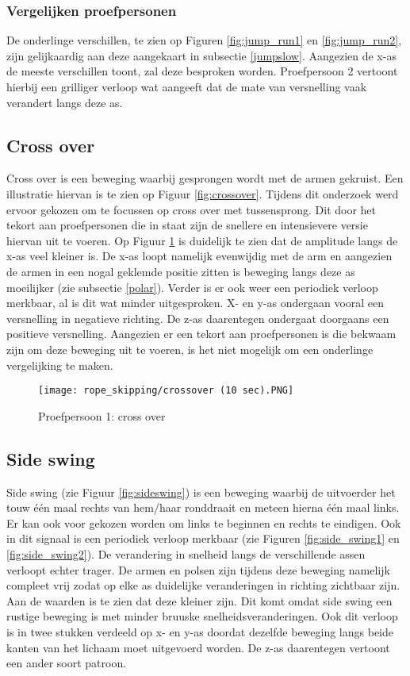\subsubsection{Vergelijken proefpersonen}
De onderlinge verschillen, te zien op Figuren \ref{fig:jump_run1} en \ref{fig:jump_run2}, zijn gelijkaardig aan deze aangekaart in subsectie \ref{jumpslow}. Aangezien de x-as de meeste verschillen toont, zal deze besproken worden. Proefpersoon 2 vertoont hierbij een grilliger verloop wat aangeeft dat de mate van versnelling vaak verandert langs deze as. 

\subsection{Cross over}

Cross over is een beweging waarbij gesprongen wordt met de armen gekruist. Een illustratie hiervan is te zien op Figuur \ref{fig:crossover}. Tijdens dit onderzoek werd ervoor gekozen om te focussen op cross over met tussensprong. Dit door het tekort aan proefpersonen die in staat zijn de snellere en intensievere versie hiervan uit te voeren.
Op Figuur \ref{fig:cross_over1} is duidelijk te zien dat de amplitude langs de x-as veel kleiner is. De x-as loopt namelijk evenwijdig met de arm en aangezien de armen in een nogal geklemde positie zitten is beweging langs deze as moeilijker (zie subsectie \ref{polar}). Verder is er ook weer een periodiek verloop merkbaar, al is dit wat minder uitgesproken.
X- en y-as ondergaan vooral een versnelling in negatieve richting. De z-as daarentegen ondergaat doorgaans een positieve versnelling.
Aangezien er een tekort aan proefpersonen is die bekwaam zijn om deze beweging uit te voeren, is het niet mogelijk om een onderlinge vergelijking te maken.

\begin{figure}[!htpd]
\centering
\caption{Proefpersoon 1: cross over}\label{fig:cross_over1}
\texttt{[image: rope\_skipping/crossover (10 sec).PNG]}
\end{figure}

\subsection{Side swing} \label{subsection:sideswing}

Side swing (zie Figuur \ref{fig:sideswing}) is een beweging waarbij de uitvoerder het touw één maal rechts van hem/haar ronddraait en meteen hierna één maal links. Er kan ook voor gekozen worden om links te beginnen en rechts te eindigen.
Ook in dit signaal is een periodiek verloop merkbaar (zie Figuren \ref{fig:side_swing1} en \ref{fig:side_swing2}). De verandering in snelheid langs de verschillende assen verloopt echter trager. De armen en polsen zijn tijdens deze beweging namelijk compleet vrij zodat op elke as duidelijke veranderingen in richting zichtbaar zijn.
Aan de waarden is te zien dat deze kleiner zijn. Dit komt omdat side swing een rustige beweging is met minder bruuske snelheidsveranderingen. Ook dit verloop is in twee stukken verdeeld op x- en y-as doordat dezelfde beweging langs beide kanten van het lichaam moet uitgevoerd worden. De z-as daarentegen vertoont een ander soort patroon. 

